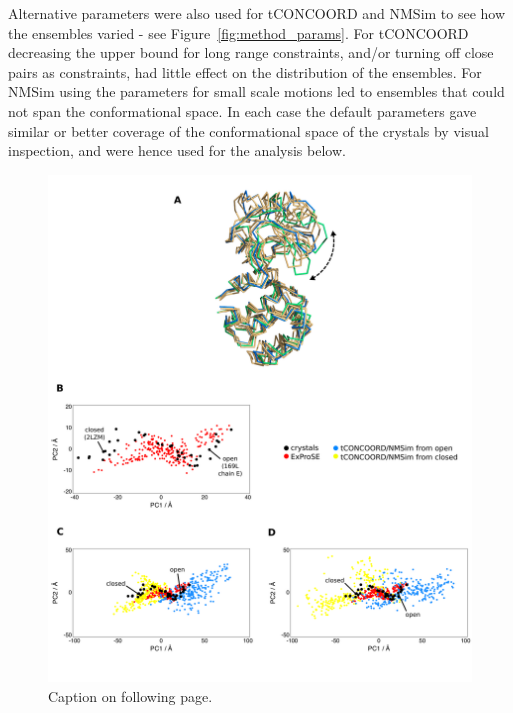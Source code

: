 Alternative parameters were also used for tCONCOORD and NMSim to see how the ensembles varied - see Figure~\ref{fig:method_params}.
For tCONCOORD decreasing the upper bound for long range constraints, and/or turning off close pairs as constraints, had little effect on the distribution of the ensembles.
For NMSim using the parameters for small scale motions led to ensembles that could not span the conformational space.
In each case the default parameters gave similar or better coverage of the conformational space of the crystals by visual inspection, and were hence used for the analysis below.


\begin{figure}
\centering

\includegraphics[width=\textwidth]{figures/t4l/t4l}

\caption[Structures and principal components analysis of T4-lysozyme ensembles]
{Caption on following page.}

\label{fig:t4l}
\end{figure}

